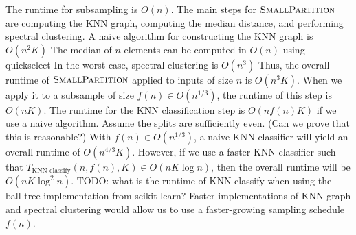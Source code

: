 \documentclass[11pt]{article}
\begin{document}
\begin{outline}
\1 The runtime for subsampling is $O(n)$.
\1 The main steps for $\textsc{SmallPartition}$ are computing the KNN graph, computing the median distance, and performing spectral clustering.
  \2 A naive algorithm for constructing the KNN graph is $O(n^2K)$
  \2 The median of $n$ elements can be computed in $O(n)$ using quickselect
  \2 In the worst case, spectral clustering is $O(n^3)$
  \2 Thus, the overall runtime of $\textsc{SmallPartition}$ applied to inputs of size $n$ is $O(n^3K)$.  When we apply it to a subsample of size $f(n) \in O(n^{1/3})$, the runtime of this step is $O(nK)$.
\1 The runtime for the KNN classification step is $O(nf(n)K)$ if we use a naive algorithm.
\1 Assume the splits are sufficiently even.  (Can we prove that this is reasonable?)
%
\1 With $f(n) \in O(n^{1/3})$, a naive KNN classifier will yield an overall runtime of $O(n^{4/3}K)$.
However, if we use a faster KNN classifier such that $T_{\text{KNN-classify}}(n, f(n), K) \in O(nK \log n)$, then the overall runtime will be $O(nK \log^2 n)$.
%
\1 TODO: what is the runtime of KNN-classify when using the ball-tree implementation from scikit-learn?
%
\1 Faster implementations of KNN-graph and spectral clustering would allow us to use a faster-growing sampling schedule $f(n)$.
\end{outline}
\end{document}
